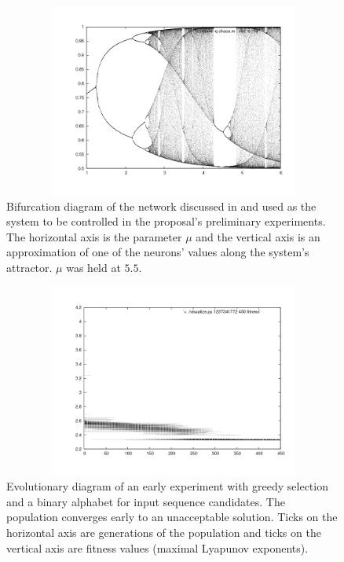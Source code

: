 \documentclass[12pt]{article}
\begin{document}
\begin{figure}[htb]
\begin{center}
\includegraphics[height=2.5in,width=4.5in]{images/network_bifurc.png}
\caption{Bifurcation diagram of the network discussed in \cite{sole} and used as the system to be controlled in the proposal's preliminary experiments.  The horizontal axis is the parameter $\mu$ and the vertical axis is an approximation of one of the neurons' values along the system's attractor.  $\mu$ was held at $5.5$.}
\end{center}
\end{figure}
\begin{figure}[htb]
\begin{center}
\includegraphics[height=2.5in,width=4.5in]{images/early_exp_greedy.png}
\caption{Evolutionary diagram of an early experiment with greedy selection and a binary alphabet for input sequence candidates.  The population converges early to an unacceptable solution.  Ticks on the horizontal axis are generations of the population and ticks on the vertical axis are fitness values (maximal Lyapunov exponents).}
\end{center}
\end{figure}
\end{document}
